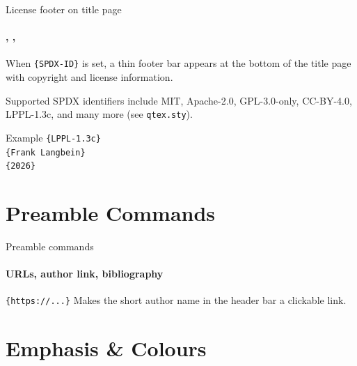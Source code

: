 \documentclass[sans,numeric,titlesplit]{qslides}
\begin{document}
\begin{frame}{License footer on title page}
  \framesubtitle{\texttt{\string\license}, \texttt{\string\copyrightholder}, \texttt{\string\licenseyear}}
  When \texttt{\string\license\{SPDX-ID\}} is set, a thin footer bar appears at the
  bottom of the title page with copyright and license information.

  Supported SPDX identifiers include MIT, Apache-2.0, GPL-3.0-only, CC-BY-4.0,
  LPPL-1.3c, and many more (see \texttt{qtex.sty}).
  \begin{codeblock}{Example}
    \texttt{\string\license\{LPPL-1.3c\}}\\
    \texttt{\string\copyrightholder\{Frank Langbein\}}\\
    \texttt{\string\licenseyear\{2026\}}
  \end{codeblock}
\end{frame}

\section{Preamble Commands}

\begin{frame}{Preamble commands}
  \framesubtitle{URLs, author link, bibliography}
  \begin{block}{\texttt{\string\setqyberauthorurl\{https://...\}}}
    Makes the short author name in the header bar a clickable link.
  \end{block}
\end{frame}

\section{Emphasis \& Colours}
\end{document}
